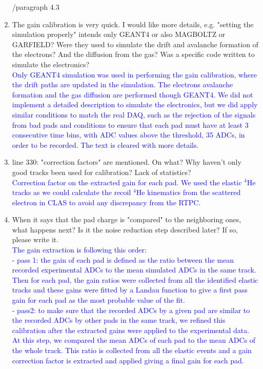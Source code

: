 \documentclass[a4paper,11pt,twoside]{article}
\begin{document}
\begin{enumerate}
        /paragraph 4.3
\item The gain calibration is very quick. I would like more details, e.g. 
   "setting the simulation properly" intends only GEANT4 or also MAGBOLTZ or 
   GARFIELD? Were they used to simulate the drift and avalanche formation of 
   the electrons? And the diffusion from the gas? Was a specific code written 
   to simulate the electronics?\\
\textcolor{blue}{Only GEANT4 simulation was used in performing the gain 
   calibration, where the drift paths are updated in the simulation. The 
   electrons avalanche formation and the gas diffusion are performed though 
GEANT4. We did not implement a detailed description to simulate the 
electronics, but we did apply similar conditions to match the real DAQ, such as 
the rejection of the signals from bad pads and conditions to ensure that each 
pad must have at least 3 consecutive time bins, with ADC values above the 
threshold, 35 ADCs, in order to be recorded. The text is cleared with more 
details. } 

\item line 330: "correction factors" are mentioned. On what? Why haven't only 
   good tracks been used for calibration? Lack of statistics?\\
\textcolor{blue}{Correction factor on the extracted gain for each pad. We used 
the elastic $^4$He tracks as we could calculate the recoil $^4$He kinematics 
from the scattered electron in CLAS to avoid any discrepancy from the RTPC.} 

\item When it says that the pad charge is "compared" to the neighboring ones, 
   what happens next? Is it the noise reduction step described later? If so, 
   please write it. \\
\textcolor{blue}{The gain extraction is following this order: \\
- pass 1: the gain of each pad is defined as the ratio between the mean 
recorded experimental ADCs to the mean simulated ADCs in the same track. Then 
for each pad, the gain ratios were collected from all the identified elastic 
tracks and these gains were fitted by a Landau function to give a
  first pass gain for each pad as the most probable value of the fit.\\
 - pass2: to make sure that the recorded ADCs by a given pad are similar to the 
 recorded ADCs by other pads in the same track, we refined this calibration 
 after the extracted gains were applied to the experimental data. At this step, 
 we compared the mean ADCs of each pad to the mean ADCs of the whole track. 
 This ratio is collected from all the elastic events and a gain correction 
 factor is extracted and applied giving a final gain for each pad.
  } 


\end{enumerate}
\end{document}
